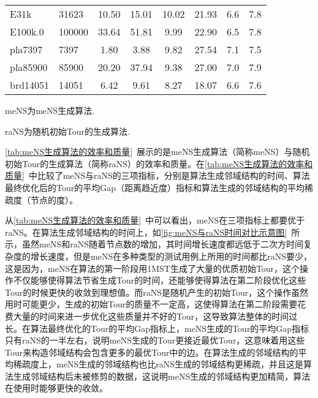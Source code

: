 \begin{table}[htbp]
\begin{threeparttable}
\begin{tabular}{ll|cc|cc|cc}
            E31k                       & 31623                      & 10.50                        & 15.01                        & 10.02                      & 21.93  & 6.6  & 7.8    \\
            E100k.0                      & 100000                     & 33.64                        & 51.81                        & 9.99                       & 22.90  & 6.5  & 7.8    \\
            \midrule
            pla7397                      & 7397                       & 1.80                         & 3.88                         & 9.82                       & 27.54  & 7.1  & 7.5    \\
            pla85900                     & 85900                      & 20.20                        & 37.94                        & 9.38                       & 27.00  & 7.0  & 7.9    \\
            \midrule
            brd14051                     & 14051                      & 6.42                         & 9.61                         & 8.27                       & 18.07  & 6.6  & 7.6    \\
            \bottomrule
        \end{tabular}
        \begin{tablenotes}
            \item meNS为meNS生成算法.
            \item raNS为随机初始Tour的生成算法.
        \end{tablenotes}
    \end{threeparttable}
\end{table}
\par
\autoref{tab:meNS生成算法的效率和质量}~展示的是meNS生成算法（简称meNS）与随机初始Tour的生成算法（简称raNS）的效率和质量。在\autoref{tab:meNS生成算法的效率和质量}~中比较了meNS与raNS的三项指标，分别是算法生成邻域结构的时间、算法最终优化后的Tour的平均Gap（距离趋近度）指标和算法生成的邻域结构的平均稀疏度（节点的度）。
\par
从\autoref{tab:meNS生成算法的效率和质量}~中可以看出，meNS在三项指标上都要优于raNS。在算法生成邻域结构的时间上，如\autoref{fig:meNS与raNS时间对比示意图}~所示，虽然meNS和raNS随着节点数的增加，其时间增长速度都远低于二次方时间复杂度的增长速度，但是meNS在多种类型的测试用例上所用的时间都比raNS要少，这是因为，meNS在算法的第一阶段用1MST生成了大量的优质初始Tour，这个操作不仅能够使得算法节省生成Tour的时间，还能够使得算法在第二阶段优化这些Tour的时候更快的收敛到理想值。而raNS是随机产生的初始Tour，这个操作虽然用时可能更少，生成的初始Tour的质量不一定高，这使得算法在第二阶段需要花费大量的时间来进一步优化这些质量并不好的Tour，这导致算法整体的时间过长。在算法最终优化的Tour的平均Gap指标上，meNS生成的Tour的平均Gap指标只有raNS的一半左右，说明meNS生成的Tour更接近最优Tour，这意味着用这些Tour来构造邻域结构会包含更多的最优Tour中的边。在算法生成的邻域结构的平均稀疏度上，meNS生成的邻域结构也比raNS生成的邻域结构更稀疏，并且这是算法生成邻域结构后未被修剪的数据，这说明meNS生成的邻域结构更加精简，算法在使用时能够更快的收敛。
